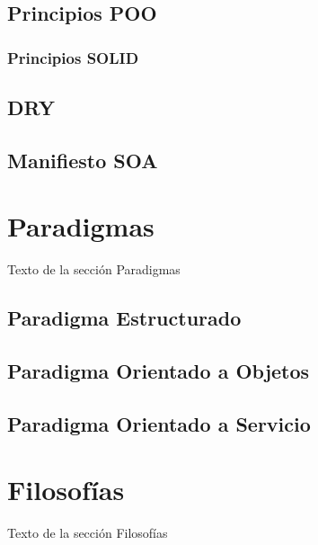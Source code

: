 \subsection{Principios POO}
\subsubsection{Principios SOLID}

\subsection{DRY}
\subsection{Manifiesto SOA}


\section{Paradigmas}

Texto de la sección Paradigmas

\subsection{Paradigma Estructurado}
\subsection{Paradigma Orientado a Objetos}
\subsection{Paradigma Orientado a Servicio}

\section{Filosofías}

Texto de la sección Filosofías

